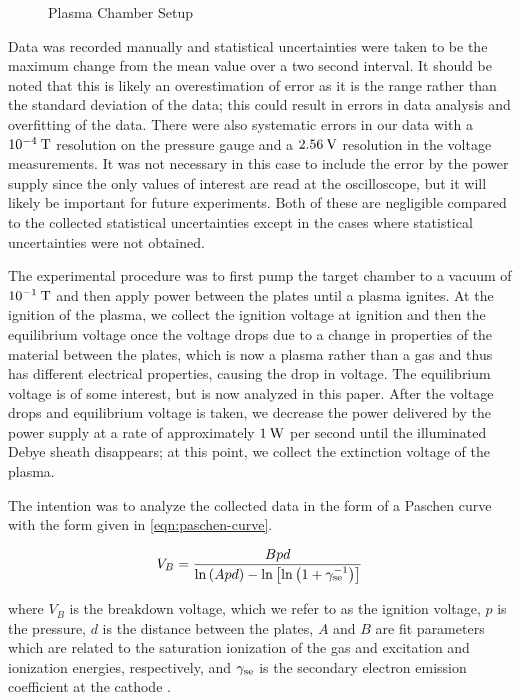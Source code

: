\documentclass[reprint]{revtex4-1}
\begin{document}
\begin{figure}

\caption{Plasma Chamber Setup}
\label{fig:plasma-chamber-diagram}
\end{figure}

Data was recorded manually and statistical uncertainties were taken to be the maximum change from the mean value over a two second interval. It should be noted that this is likely an overestimation of error as it is the range rather than the standard deviation of the data; this could result in errors in data analysis and overfitting of the data. There were also systematic errors in our data with a $10^{-4}\:\rm{T}$ resolution on the pressure gauge and a $2.56\:\rm{V}$ resolution in the voltage measurements. It was not necessary in this case to include the error by the power supply since the only values of interest are read at the oscilloscope, but it will likely be important for future experiments. Both of these are negligible compared to the collected statistical uncertainties except in the cases where statistical uncertainties were not obtained.

The experimental procedure was to first pump the target chamber to a vacuum of $10^{-1}\:\rm{T}$ and then apply power between the plates until a plasma ignites. At the ignition of the plasma, we collect the ignition voltage at ignition and then the equilibrium voltage once the voltage drops due to a change in properties of the material between the plates, which is now a plasma rather than a gas and thus has different electrical properties, causing the drop in voltage. The equilibrium voltage is of some interest, but is now analyzed in this paper. After the voltage drops and equilibrium voltage is taken, we decrease the power delivered by the power supply at a rate of approximately $1\:\rm{W}$ per second until the illuminated Debye sheath disappears; at this point, we collect the extinction voltage of the plasma.

The intention was to analyze the collected data in the form of a Paschen curve with the form given in \cref{eqn:paschen-curve}.

\begin{equation}
V_B = \frac{B p d}{\ln{\left( A p d \right)} - \ln{\left[ \ln{\left( 1 + \gamma_{\rm{se}}^{-1} \right)} \right]}}
\label{eqn:paschen-curve}
\end{equation}

where $V_B$ is the breakdown voltage, which we refer to as the ignition voltage, $p$ is the pressure, $d$ is the distance between the plates, $A$ and $B$ are fit parameters which are related to the saturation ionization of the gas and excitation and ionization energies, respectively, and $\gamma_{\rm{se}}$ is the secondary electron emission coefficient at the cathode \cite{Lieberman2005}.
\end{document}
